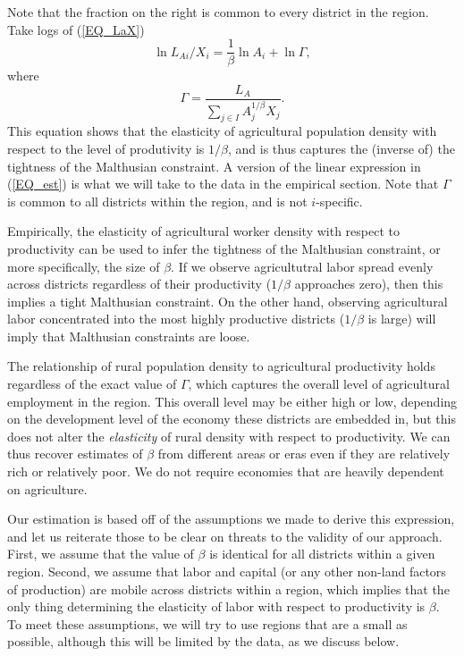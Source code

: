 \documentclass[11pt]{article}
\begin{document}
Note that the fraction on the right is common to every district in the region. Take logs of (\ref{EQ_LaX}) 
\begin{equation}
\ln L_{Ai}/X_i = \frac{1}{\beta} \ln A_{i} + \ln \Gamma, \label{EQ_est}
\end{equation}
where
\begin{equation}
    \Gamma = \frac{L_A}{\sum_{j\in I} A_{j}^{1/\beta}X_{j}}.
\end{equation}
This equation shows that the elasticity of agricultural population density with respect to the level of produtivity is $1/\beta$, and is thus captures the (inverse of) the tightness of the Malthusian constraint. A version of the linear expression in (\ref{EQ_est}) is what we will take to the data in the empirical section. Note that $\Gamma$ is common to all districts within the region, and is not $i$-specific. 

Empirically, the elasticity of agricultural worker density with respect to productivity can be used to infer the tightness of the Malthusian constraint, or more specifically, the size of $\beta$. If we observe agricultutral labor spread evenly across districts regardless of their productivity ($1/\beta$ approaches zero), then this implies a tight Malthusian constraint. On the other hand, observing agricultural labor concentrated into the most highly productive districts ($1/\beta$ is large) will imply that Malthusian constraints are loose. 

The relationship of rural population density to agricultural productivity holds regardless of the exact value of $\Gamma$, which captures the overall level of agricultural employment in the region. This overall level may be either high or low, depending on the development level of the economy these districts are embedded in, but this does not alter the \textit{elasticity} of rural density with respect to productivity. We can thus recover estimates of $\beta$ from different areas or eras even if they are relatively rich or relatively poor. We do not require economies that are heavily dependent on agriculture.

Our estimation is based off of the assumptions we made to derive this expression, and let us reiterate those to be clear on threats to the validity of our approach. First, we assume that the value of $\beta$ is identical for all districts within a given region. Second, we assume that labor and capital (or any other non-land factors of production) are mobile across districts within a region, which implies that the only thing determining the elasticity of labor with respect to productivity is $\beta$. To meet these assumptions, we will try to use regions that are a small as possible, although this will be limited by the data, as we discuss below. 
\end{document}
